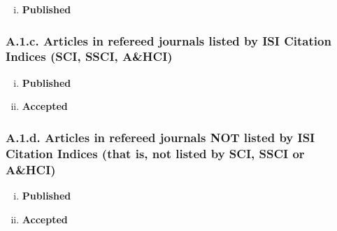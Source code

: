 \documentclass[12pt]{article}
\begin{document}

\begin{enumerate}[i)]
\item {\bf Published} 
\end{enumerate}

\subsubsection*{A.1.c. Articles in refereed journals listed by ISI Citation Indices (SCI, SSCI, A\&HCI)}

% 

\begin{enumerate}[i)]
\item {\bf Published} %

\item {\bf Accepted} %
\end{enumerate}

\subsubsection*{A.1.d. Articles in refereed journals NOT listed by ISI Citation Indices (that is, not listed by SCI, SSCI or A\&HCI)}
 
\begin{enumerate}[i)]
\item  {\bf Published} %

\item  {\bf Accepted} %
\end{enumerate}
\end{document}
